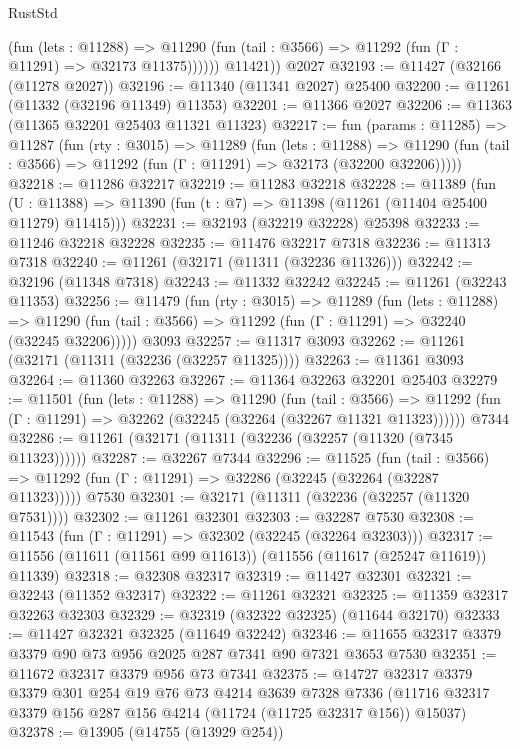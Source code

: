 \begin{lexlean}{RustStd}
\begin{coremodule}
              (fun (lets : @11288) =>
              @11290 (fun (tail : @3566) => @11292 (fun (Γ : @11291) => @32173 @11375))))))
        @11421))
    @2027
@32193 := @11427 (@32166 (@11278 @2027))
@32196 := @11340 (@11341 @2027) @25400
@32200 := @11261 (@11332 (@32196 @11349) @11353)
@32201 := @11366 @2027
@32206 := @11363 (@11365 @32201 @25403 @11321 @11323)
@32217 := fun (params : @11285) =>
  @11287
    (fun (rty : @3015) =>
    @11289
      (fun (lets : @11288) =>
      @11290 (fun (tail : @3566) => @11292 (fun (Γ : @11291) => @32173 (@32200 @32206)))))
@32218 := @11286 @32217
@32219 := @11283 @32218
@32228 := @11389
    (fun (U : @11388) => @11390 (fun (t : @7) => @11398 (@11261 (@11404 @25400 @11279) @11415)))
@32231 := @32193 (@32219 @32228) @25398
@32233 := @11246 @32218 @32228
@32235 := @11476 @32217 @7318
@32236 := @11313 @7318
@32240 := @11261 (@32171 (@11311 (@32236 @11326)))
@32242 := @32196 (@11348 @7318)
@32243 := @11332 @32242
@32245 := @11261 (@32243 @11353)
@32256 := @11479
    (fun (rty : @3015) =>
    @11289
      (fun (lets : @11288) =>
      @11290 (fun (tail : @3566) => @11292 (fun (Γ : @11291) => @32240 (@32245 @32206)))))
    @3093
@32257 := @11317 @3093
@32262 := @11261 (@32171 (@11311 (@32236 (@32257 @11325))))
@32263 := @11361 @3093
@32264 := @11360 @32263
@32267 := @11364 @32263 @32201 @25403
@32279 := @11501
    (fun (lets : @11288) =>
    @11290
      (fun (tail : @3566) =>
      @11292 (fun (Γ : @11291) => @32262 (@32245 (@32264 (@32267 @11321 @11323))))))
    @7344
@32286 := @11261 (@32171 (@11311 (@32236 (@32257 (@11320 (@7345 @11323))))))
@32287 := @32267 @7344
@32296 := @11525
    (fun (tail : @3566) => @11292 (fun (Γ : @11291) => @32286 (@32245 (@32264 (@32287 @11323)))))
    @7530
@32301 := @32171 (@11311 (@32236 (@32257 (@11320 @7531))))
@32302 := @11261 @32301
@32303 := @32287 @7530
@32308 := @11543 (fun (Γ : @11291) => @32302 (@32245 (@32264 @32303)))
@32317 := @11556 (@11611 (@11561 @99 @11613)) (@11556 (@11617 (@25247 @11619)) @11339)
@32318 := @32308 @32317
@32319 := @11427 @32301
@32321 := @32243 (@11352 @32317)
@32322 := @11261 @32321
@32325 := @11359 @32317 @32263 @32303
@32329 := @32319 (@32322 @32325) (@11644 @32170)
@32333 := @11427 @32321 @32325 (@11649 @32242)
@32346 := @11655 @32317 @3379 @3379 @90 @73 @956 @2025 @287 @7341 @90 @7321 @3653 @7530
@32351 := @11672 @32317 @3379 @956 @73 @7341
@32375 := @14727
    @32317
    @3379
    @3379
    @301
    @254
    @19
    @76
    @73
    @4214
    @3639
    @7328
    @7336
    (@11716 @32317 @3379 @156 @287 @156 @4214 (@11724 (@11725 @32317 @156)) @15037)
@32378 := @13905 (@14755 (@13929 @254))

\end{coremodule}
\end{lexlean}
